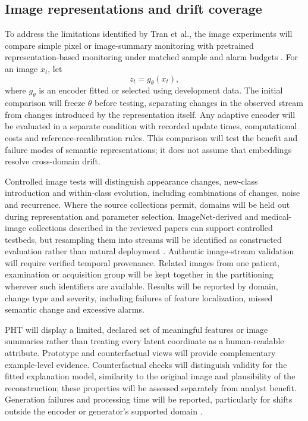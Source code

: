 \documentclass[10pt,a4paper]{article}
\begin{document}
\subsection{Image representations and drift coverage}
To address the limitations identified by Tran et al., the image experiments will compare simple pixel or image-summary monitoring with pretrained representation-based monitoring under matched sample and alarm budgets \cite{tran}. For an image $x_t$, let
\[
 z_t=g_{\theta}(x_t),
\]
where $g_{\theta}$ is an encoder fitted or selected using development data. The initial comparison will freeze $\theta$ before testing, separating changes in the observed stream from changes introduced by the representation itself. Any adaptive encoder will be evaluated in a separate condition with recorded update times, computational costs and reference-recalibration rules. This comparison will test the benefit and failure modes of semantic representations; it does not assume that embeddings resolve cross-domain drift.

Controlled image tests will distinguish appearance changes, new-class introduction and within-class evolution, including combinations of changes, noise and recurrence. Where the source collections permit, domains will be held out during representation and parameter selection. ImageNet-derived and medical-image collections described in the reviewed papers can support controlled testbeds, but resampling them into streams will be identified as constructed evaluation rather than natural deployment \cite{hinder2023,roschewitz,tran}. Authentic image-stream validation will require verified temporal provenance. Related images from one patient, examination or acquisition group will be kept together in the partitioning wherever such identifiers are available. Results will be reported by domain, change type and severity, including failures of feature localization, missed semantic change and excessive alarms.

PHT will display a limited, declared set of meaningful features or image summaries rather than treating every latent coordinate as a human-readable attribute. Prototype and counterfactual views will provide complementary example-level evidence. Counterfactual checks will distinguish validity for the fitted explanation model, similarity to the original image and plausibility of the reconstruction; these properties will be assessed separately from analyst benefit. Generation failures and processing time will be reported, particularly for shifts outside the encoder or generator's supported domain \cite{hinder2023,hinder2024,galmeanu}.
\end{document}
